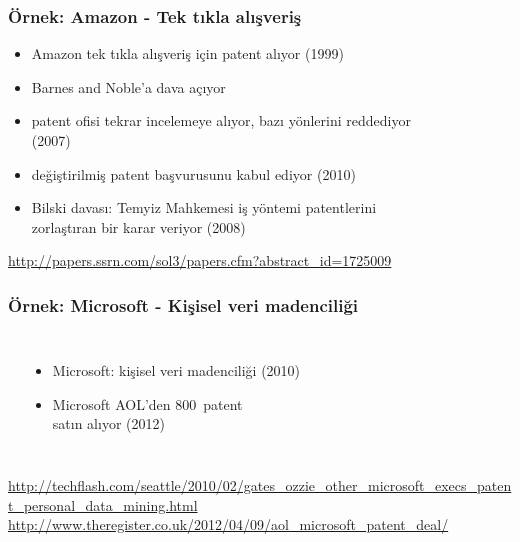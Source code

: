 \documentclass[dvipsnames]{beamer}
\theoremstyle{plain}
\begin{document}
\begin{frame}
  \frametitle{Örnek: Amazon - Tek tıkla alışveriş}

  \begin{itemize}
    \item Amazon tek tıkla alışveriş için patent alıyor (1999)
    \item Barnes and Noble'a dava açıyor
    \item patent ofisi tekrar incelemeye alıyor, bazı yönlerini reddediyor\\
      (2007)
    \item değiştirilmiş patent başvurusunu kabul ediyor (2010)

    \pause
    \medskip
    \item Bilski davası: Temyiz Mahkemesi iş yöntemi patentlerini\\
      zorlaştıran bir karar veriyor (2008)
  \end{itemize}

  \medskip
  \tiny{\url{http://papers.ssrn.com/sol3/papers.cfm?abstract_id=1725009}}\\
\end{frame}

\begin{frame}
  \frametitle{Örnek: Microsoft - Kişisel veri madenciliği}

  \begin{columns}
    \begin{center}
    \end{center}

    \begin{itemize}
      \item Microsoft: kişisel veri madenciliği (2010)
      \item Microsoft AOL'den 800~patent\\
        satın alıyor (2012)
    \end{itemize}
  \end{columns}

  \medskip
  \tiny{\url{http://techflash.com/seattle/2010/02/gates_ozzie_other_microsoft_execs_patent_personal_data_mining.html}}\\
  \tiny{\url{http://www.theregister.co.uk/2012/04/09/aol_microsoft_patent_deal/}}\\
\end{frame}
\end{document}
